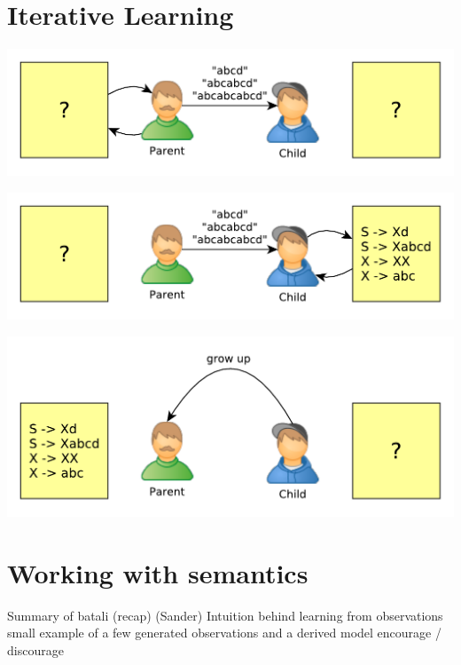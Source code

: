 \documentclass[11pt,a4paper,xcolor=dvipsnames]{beamer}
\begin{document}
\section{Iterative Learning}
\begin{frame}
  \begin{center}
    \includegraphics[scale=0.6]{assets/iterative1.pdf}
  \end{center}
\end{frame}

\begin{frame}
  \begin{center}
    \includegraphics[scale=0.6]{assets/iterative2.pdf}
  \end{center}
\end{frame}

\begin{frame}
  \begin{center}
    \includegraphics[scale=0.6]{assets/iterative3.pdf}
  \end{center}
\end{frame}

\section{Working with semantics}
\begin{frame}
  Summary of batali (recap) (Sander)
Intuition behind learning from observations
small example of a few generated observations and a derived model
  encourage / discourage
\end{frame}
\end{document}
